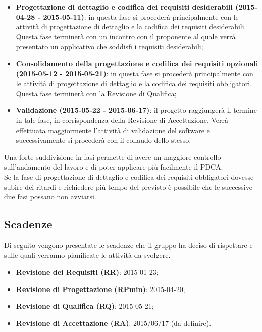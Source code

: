 \begin{itemize}
			\item \textbf{Progettazione di dettaglio e codifica dei requisiti desiderabili (2015-04-28 - 2015-05-11)}: in questa fase si procederà principalmente con le attività di progettazione di dettaglio e la codifica dei requisiti desiderabili. Questa fase terminerà con un incontro con il proponente al quale verrà presentato un applicativo che soddisfi i requisiti desiderabili;
			
			\item \textbf{Consolidamento della progettazione e codifica dei requisiti opzionali (2015-05-12 - 2015-05-21)}: in questa fase si procederà principalmente con le attività di progettazione di dettaglio e la codifica dei requisiti obbligatori. Questa fase terminerà con la Revisione di Qualifica;
			
			\item \textbf{Validazione (2015-05-22 - 2015-06-17)}: il progetto raggiungerà il termine in tale fase, in corrispondenza della Revisione di Accettazione. Verrà effettuata maggiormente l’attività di validazione del software e successivamente si procederà con il collaudo dello stesso.
		\end{itemize}
\noindent
	Una forte suddivisione in fasi permette di avere un maggiore controllo sull'andamento del lavoro e di poter applicare più facilmente il PDCA. \\
	Se la fase di progettazione di dettaglio e codifica dei requisiti obbligatori dovesse subire dei ritardi e richiedere più tempo del previsto è possibile che le successive due fasi possano non avviarsi.

	\subsection{Scadenze}
	Di seguito vengono presentate le scadenze che il gruppo \groupName{} ha deciso di rispettare e sulle quali verranno pianificate le attività da svolgere.
		\begin{itemize}
			\item \textbf{Revisione dei Requisiti (RR)}: 2015-01-23;
			\item \textbf{Revisione di Progettazione (RPmin)}: 2015-04-20;
			\item \textbf{Revisione di Qualifica (RQ)}: 2015-05-21;
			\item \textbf{Revisione di Accettazione (RA)}: 2015/06/17 (da definire).
		\end{itemize}